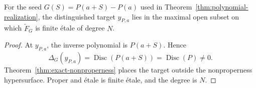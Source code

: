\begin{corollary}
\label{cor:intrinsic-fullness}
For the seed \(G(S)=P(a+S)-P(a)\) used in
Theorem~\ref{thm:polynomial-realization}, the distinguished target
\(y_{P,a}\) lies in the
maximal open subset on which \(\widetilde F_G\) is finite \'etale of degree
\(N\).
\end{corollary}

\begin{proof}
At \(y_{P,a}\), the inverse polynomial is \(P(a+S)\).  Hence
\[
 \Delta_G(y_{P,a})=\operatorname{Disc}(P(a+S))
 =\operatorname{Disc}(P)\neq0.
\]
Theorem~\ref{thm:exact-nonproperness} places the target outside the
nonproperness hypersurface.  Proper and \'etale is finite \'etale, and the
degree is \(N\).
\end{proof}
